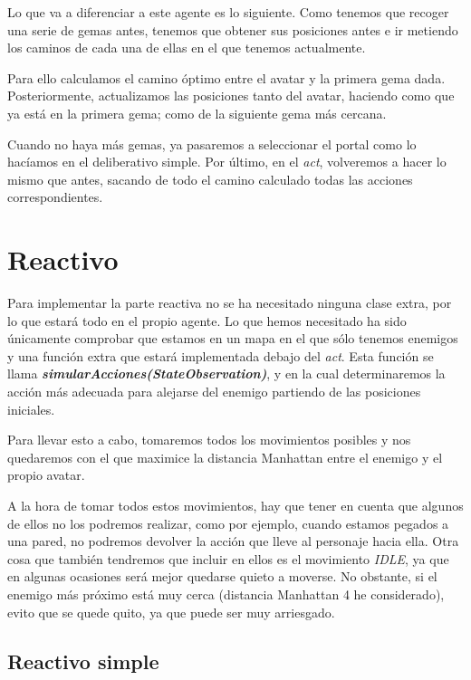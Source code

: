 \documentclass[11pt,a4paper]{article}
\begin{document}
Lo que va a diferenciar a este agente es lo siguiente. Como tenemos que recoger una serie de gemas antes, tenemos
que obtener sus posiciones antes e ir metiendo los caminos de cada una de ellas en el que tenemos actualmente.

Para ello calculamos el camino óptimo entre el avatar y la primera gema dada. Posteriormente, actualizamos las
posiciones tanto del avatar, haciendo como que ya está en la primera gema; como de la siguiente gema más cercana.

Cuando no haya más gemas, ya pasaremos a seleccionar el portal como lo hacíamos en el deliberativo simple. Por
último, en el \textit{act}, volveremos a hacer lo mismo que antes, sacando de todo el camino calculado todas
las acciones correspondientes.



\section{Reactivo}

Para implementar la parte reactiva no se ha necesitado ninguna clase extra, por lo que estará todo en el
propio agente. Lo que hemos necesitado ha sido únicamente comprobar que estamos en un mapa en el que sólo
tenemos enemigos y una función extra que estará implementada debajo del \textit{act}. Esta función se llama
\textbf{\textit{simularAcciones(StateObservation)}}, y en la cual determinaremos la acción más adecuada para
alejarse del enemigo partiendo de las posiciones iniciales.

Para llevar esto a cabo, tomaremos todos los movimientos posibles y nos quedaremos con el que maximice la
distancia Manhattan entre el enemigo y el propio avatar.

A la hora de tomar todos estos movimientos, hay que tener en cuenta que algunos de ellos no los podremos
realizar, como por ejemplo, cuando estamos pegados a una pared, no podremos devolver la acción que lleve
al personaje hacia ella. Otra cosa que también tendremos que incluir en ellos es el movimiento \textit{IDLE},
ya que en algunas ocasiones será mejor quedarse quieto a moverse. No obstante, si el enemigo más próximo
está muy cerca (distancia Manhattan 4 he considerado), evito que se quede quito, ya que puede ser muy arriesgado.



\subsection{Reactivo simple}
\end{document}
